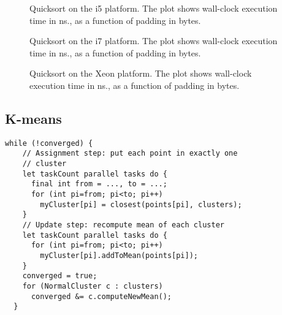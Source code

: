 \begin{figure}[hbpt]
\graphicspath{{plots/}}

	\caption{Quicksort on the i5 platform. The plot shows wall-clock execution time in
	ns., as a function of padding in bytes.}
	\label{fig:qsort-i5}
\end{figure}

\begin{figure}[hbpt]
\graphicspath{{plots/}}

	\caption{Quicksort on the i7 platform. The plot shows wall-clock execution time in
	ns., as a function of padding in bytes.}
	\label{fig:qsort-i7}
\end{figure}

\begin{figure}[hbpt]
\graphicspath{{plots/}}

	\caption{Quicksort on the Xeon platform. The plot shows wall-clock execution time in
	ns., as a function of padding in bytes.}
	\label{fig:qsort-xeon}
\end{figure}



\subsection{K-means}

\begin{code}
\begin{Verbatim}[frame=single]
  while (!converged) {
    // Assignment step: put each point in exactly one
    // cluster
    let taskCount parallel tasks do {
      final int from = ..., to = ...;
      for (int pi=from; pi<to; pi++) 
        myCluster[pi] = closest(points[pi], clusters);
    }
    // Update step: recompute mean of each cluster
    let taskCount parallel tasks do {
      for (int pi=from; pi<to; pi++)
        myCluster[pi].addToMean(points[pi]);
    }
    converged = true;
    for (NormalCluster c : clusters)
      converged &= c.computeNewMean();
  }
\end{Verbatim}
	\caption{Simplified code for the original k-means implementation, KMeans2P.}
\end{code}

